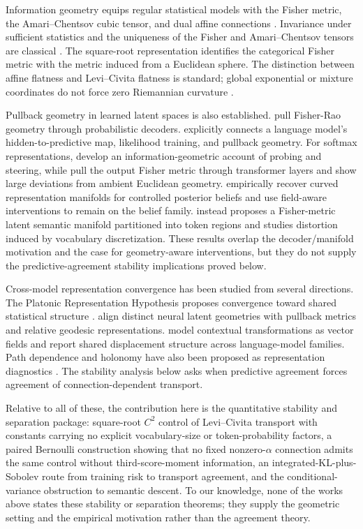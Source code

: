 \documentclass[11pt]{article}
\theoremstyle{definition}
\theoremstyle{remark}
\begin{document}
Information geometry equips regular statistical models with the Fisher metric, the Amari--Chentsov cubic tensor, and dual affine connections \citep{amariNagaoka2000,amari2016,ayEtAl2018parametrized}. Invariance under sufficient statistics and the uniqueness of the Fisher and Amari--Chentsov tensors are classical \citep{cencov1982,ayJostLeSchwachhofer2015}. The square-root representation identifies the categorical Fisher metric with the metric induced from a Euclidean sphere. The distinction between affine flatness and Levi--Civita flatness is standard; global exponential or mixture coordinates do not force zero Riemannian curvature \citep{calinUdriste2014}.

Pullback geometry in learned latent spaces is also established. \citet{arvanitidisEtAl2022} pull Fisher-Rao geometry through probabilistic decoders. \citet{zhang2025} explicitly connects a language model's hidden-to-predictive map, likelihood training, and pullback geometry. For softmax representations, \citet{parkEtAl2026} develop an information-geometric account of probing and steering, while \citet{wangZhao2026} pull the output Fisher metric through transformer layers and show large deviations from ambient Euclidean geometry. \citet{sarfatiEtAl2026} empirically recover curved representation manifolds for controlled posterior beliefs and use field-aware interventions to remain on the belief family. \citet{mabrok2026} instead proposes a Fisher-metric latent semantic manifold partitioned into token regions and studies distortion induced by vocabulary discretization. These results overlap the decoder/manifold motivation and the case for geometry-aware interventions, but they do not supply the predictive-agreement stability implications proved below.

Cross-model representation convergence has been studied from several directions. The Platonic Representation Hypothesis proposes convergence toward shared statistical structure \citep{huhEtAl2024}. \citet{yuEtAl2025} align distinct neural latent geometries with pullback metrics and relative geodesic representations. \citet{huNiuVarma2026} model contextual transformations as vector fields and report shared displacement structure across language-model families. Path dependence and holonomy have also been proposed as representation diagnostics \citep{sevetlidisPavlidis2026}. The stability analysis below asks when predictive agreement forces agreement of connection-dependent transport.

Relative to all of these, the contribution here is the quantitative stability and separation package: square-root $C^2$ control of Levi--Civita transport with constants carrying no explicit vocabulary-size or token-probability factors, a paired Bernoulli construction showing that no fixed nonzero-$\alpha$ connection admits the same control without third-score-moment information, an integrated-KL-plus-Sobolev route from training risk to transport agreement, and the conditional-variance obstruction to semantic descent. To our knowledge, none of the works above states these stability or separation theorems; they supply the geometric setting and the empirical motivation rather than the agreement theory.
\end{document}
